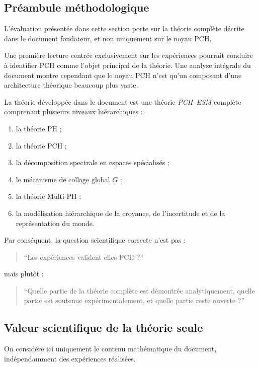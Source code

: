 \subsection{Préambule méthodologique}

L'évaluation présentée dans cette section porte sur la théorie complète décrite dans le document fondateur, et non uniquement sur le noyau PCH.

Une première lecture centrée exclusivement sur les expériences pourrait conduire à identifier PCH comme l'objet principal de la théorie. Une analyse intégrale du document montre cependant que le noyau PCH n'est qu'un composant d'une architecture théorique beaucoup plus vaste.

La théorie développée dans le document est une théorie \emph{PCH--ESM} complète comprenant plusieurs niveaux hiérarchiques :

\begin{enumerate}
    \item la théorie PH ;
    \item la théorie PCH ;
    \item la décomposition spectrale en espaces spécialisés ;
    \item le mécanisme de collage global \(G\) ;
    \item la théorie Multi-PH ;
    \item la modélisation hiérarchique de la croyance, de l'incertitude et de la représentation du monde.
\end{enumerate}

Par conséquent, la question scientifique correcte n'est pas :

\begin{quote}
``Les expériences valident-elles PCH ?''
\end{quote}

mais plutôt :

\begin{quote}
``Quelle partie de la théorie complète est démontrée analytiquement, quelle partie est soutenue expérimentalement, et quelle partie reste ouverte ?''
\end{quote}

\subsection{Valeur scientifique de la théorie seule}

On considère ici uniquement le contenu mathématique du document, indépendamment des expériences réalisées.

